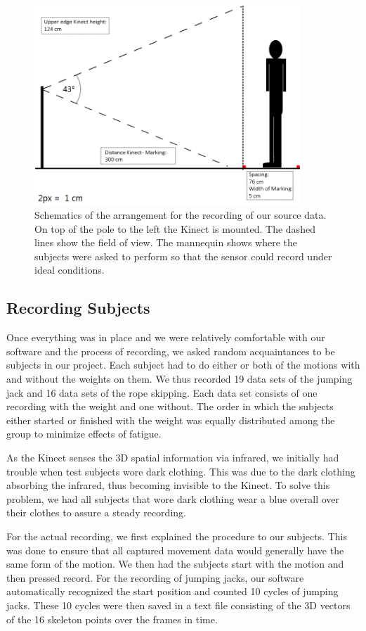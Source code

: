 \documentclass[a4paper]{article}
\begin{document}
\begin{figure}
	\centering
	\includegraphics[width=10cm]{Aufbauohnelizenz.png}
	\caption{Schematics of the arrangement for the recording of our source data. On top of the pole to the left the Kinect is mounted. The dashed lines show the field of view. The mannequin shows where the subjects were asked to perform so that the sensor could record under ideal conditions.}
	\label{fig:schematic}
\end{figure}

\subsection{Recording Subjects}

Once everything was in place and we were relatively comfortable with our software and the process of recording, we asked random acquaintances to be subjects in our project.
Each subject had to do either or both of the motions with and without the weights on them.
We thus recorded 19 data sets of the jumping jack and 16 data sets of the rope skipping.
Each data set consists of one recording with the weight and one without.
The order in which the subjects either started or finished with the weight was equally distributed among the group to minimize effects of fatigue.

As the Kinect senses the 3D spatial information via infrared, we initially had trouble when test subjects wore dark clothing.
This was due to the dark clothing absorbing the infrared, thus becoming invisible to the Kinect.
To solve this problem, we had all subjects that wore dark clothing wear a blue overall over their clothes to assure a steady recording.

For the actual recording, we first explained the procedure to our subjects.
This was done to ensure that all captured movement data would generally have the same form of the motion.
We then had the subjects start with the motion and then pressed record.
For the recording of jumping jacks, our software automatically recognized the start position and counted 10 cycles of jumping jacks.
These 10 cycles were then saved in a text file consisting of the 3D vectors of the 16 skeleton points over the frames in time.
\end{document}
